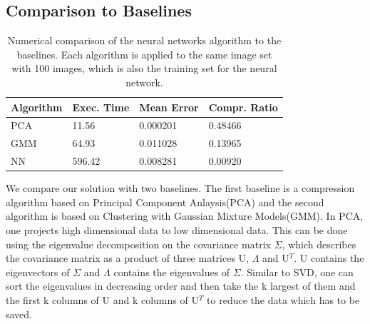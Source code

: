 



\subsection{Comparison to Baselines}


\begin{table}
\centering
    \begin{tabular}{| l | l | l | l |}
    \hline
    Algorithm & Exec. Time & Mean Error & Compr. Ratio \\ \hline
    PCA & 11.56 & 0.000201 & 0.48466\\ \hline
    GMM & 64.93 & 0.011028 & 0.13965 \\ \hline
    NN & 596.42 & 0.008281 & 0.00920 \\
    \hline
    \end{tabular}
    \caption{Numerical comparison of the neural networks algorithm to the baselines. Each algorithm is applied to the same image set with 100 images, which is also the training set for the neural network.}
    \label{tab:compareBaselines}
\end{table}

We compare our solution with two baselines. The first baseline is a compression algorithm based on Principal Component Anlaysis(PCA) and the second algorithm is based on Clustering with Gaussian Mixture Models(GMM).  
\newline
In PCA, one projects high dimensional data to low dimensional data. This can be done using the eigenvalue decomposition on the covariance matrix $\Sigma$, which describes the covariance matrix as a product of three matrices U, $\Lambda$ and U$^T$. U contains the eigenvectors of  $\Sigma$ and $\Lambda$ contains the eigenvalues of $\Sigma$. Similar to SVD, one can sort the eigenvalues in decreasing order and then take the k largest of them and the first k columns of U and k columns of U$^T$ to reduce the data which has to be saved. 
\newline

